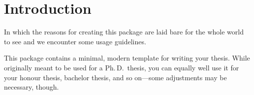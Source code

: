 \chapter{Introduction}

\begin{center}
  \begin{minipage}{0.5\textwidth}
    \begin{small}
      In which the reasons for creating this package are laid bare for the
      whole world to see and we encounter some usage guidelines.
    \end{small}
  \end{minipage}
  \vspace{0.5cm}
\end{center}

\noindent This package contains a minimal, modern template for writing your
thesis. While originally meant to be used for a Ph.\,D.\ thesis, you can
equally well use it for your honour thesis, bachelor thesis, and so
on---some adjustments may be necessary, though.